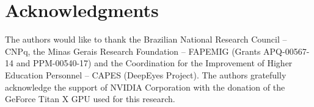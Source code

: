 \documentclass[10pt,conference]{IEEEtran}
\begin{document}
\section*{Acknowledgments}

The authors would like to thank the Brazilian National Research Council -- CNPq, the Minas Gerais Research Foundation -- FAPEMIG (Grants APQ-00567-14 and PPM-00540-17) and the Coordination for the Improvement of Higher Education Personnel -- CAPES (DeepEyes Project). The authors gratefully acknowledge the support of NVIDIA Corporation with the donation of the GeForce Titan X GPU used for this research.


\balance


\end{document}
